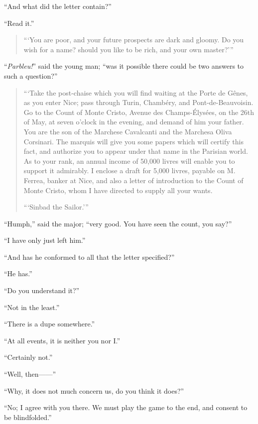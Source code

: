 “And what did the letter contain?”

“Read it.”

\begin{quote}
{\small“‘You are poor, and your future prospects are dark and gloomy. Do you
wish for a name? should you like to be rich, and your own master?’”}
\end{quote}

“\textit{Parbleu!}” said the young man; “was it possible there could be two
answers to such a question?”

\begin{quote}
{\small“‘Take the post-chaise which you will find waiting at the Porte de
Gênes, as you enter Nice; pass through Turin, Chambéry, and
Pont-de-Beauvoisin. Go to the Count of Monte Cristo, Avenue des
Champs-Élysées, on the 26th of May, at seven o’clock in the evening,
and demand of him your father. You are the son of the Marchese
Cavalcanti and the Marchesa Oliva Corsinari. The marquis will give you
some papers which will certify this fact, and authorize you to appear
under that name in the Parisian world. As to your rank, an annual
income of 50,000 livres will enable you to support it admirably. I
enclose a draft for 5,000 livres, payable on M. Ferrea, banker at Nice,
and also a letter of introduction to the Count of Monte Cristo, whom I
have directed to supply all your wants.

\begin{flushright}
“‘Sinbad the Sailor.’”
\end{flushright}}
\end{quote}

“Humph,” said the major; “very good. You have seen the count, you say?”

“I have only just left him.”

“And has he conformed to all that the letter specified?”

“He has.”

“Do you understand it?”

“Not in the least.”

“There is a dupe somewhere.”

“At all events, it is neither you nor I.”

“Certainly not.”

“Well, then——”

“Why, it does not much concern us, do you think it does?”

“No; I agree with you there. We must play the game to the end, and
consent to be blindfolded.”

